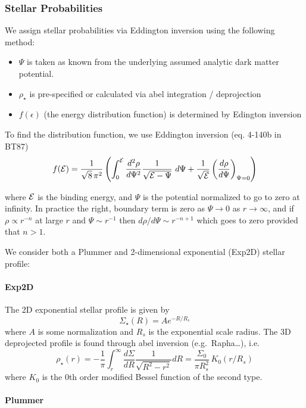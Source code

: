 \subsubsection{Stellar Probabilities}\label{stellar-probabilities}

We assign stellar probabilities via Eddington inversion using the
following method:

\begin{itemize}
\tightlist
\item
  \(\Psi\) is taken as known from the underlying assumed analytic dark
  matter potential.
\item
  \(\rho_\star\) is pre-specified or calculated via abel integration /
  deprojection
\item
  \(f(\epsilon)\) (the energy distribution function) is determined by
  Edington inversion
\end{itemize}

To find the distribution function, we use Eddington inversion (eq.
4-140b in BT87) \[
f({\cal E}) = \frac{1}{\sqrt{8}\, \pi^2}\left( \int_0^{\cal E} \frac{d^2\rho}{d\Psi^2} \frac{1}{\sqrt{{\cal E} - \Psi}}\ d\Psi + \frac{1}{\sqrt{\cal E}} \left(\frac{d\rho}{d\Psi}\right)_{\Psi=0} \right)
\]

where \({\cal E}\) is the binding energy, and \(\Psi\) is the potential
normalized to go to zero at infinity. In practice the right, boundary
term is zero as \(\Psi \to 0\) as \(r\to\infty\), and if
\(\rho \propto r^{-n}\) at large \(r\) and \(\Psi \sim r^{-1}\) then
\(d\rho / d\Psi \sim r^{-n+1}\) which goes to zero provided that
\(n > 1\).

We consider both a Plummer and 2-dimensional exponential (Exp2D) stellar
profile:

\paragraph{Exp2D}\label{exp2d}

The 2D exponential stellar profile is given by \[
\Sigma_\star(R) = A e^{-R / R_s}
\] where \(A\) is some normalization and \(R_s\) is the exponential
scale radius. The 3D deprojected profile is found through abel inversion
(e.g.~Rapha\ldots), i.e. \[
\rho_\star (r) =- \frac{1}{\pi}\int_r^\infty \frac{d\Sigma}{dR} \frac{1}{\sqrt{R^2 - r^2}} dR  = \frac{\Sigma_0}{\pi R_s^2}\,K_0(r/R_s)
\] where \(K_0\) is the 0th order modified Bessel function of the second
type.

\paragraph{Plummer}\label{plummer}

